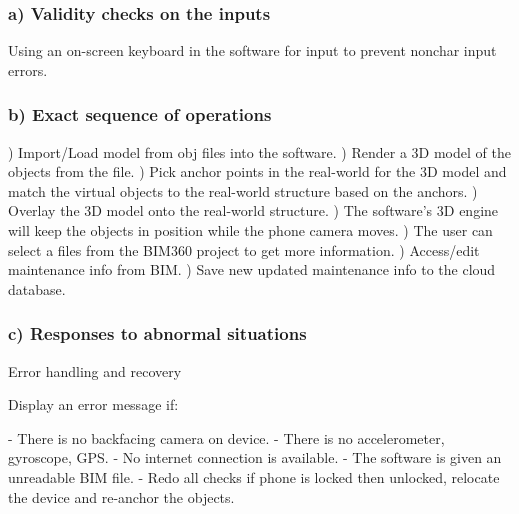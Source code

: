 \documentclass[onecolumn, draftclsnofoot,10pt, compsoc]{IEEEtran}
\begin{document}
        \subsubsection*{a) Validity checks on the inputs}
            \hangindent=10mm\noindent Using an on-screen keyboard in the software for input to prevent nonchar input errors. \par

        \subsubsection*{b) Exact sequence of operations}
            \hangindent=10mm) Import/Load model from obj files into the software. ) Render a 3D model of the objects from the file. ) Pick anchor points in the real-world for the 3D model and match the virtual objects to the real-world structure based on the anchors. ) Overlay the 3D model onto the real-world structure. ) The software's 3D engine will keep the objects in position while the phone camera moves. ) The user can select a files from the BIM360 project to get more information. ) Access/edit maintenance info from BIM. ) Save new updated maintenance info to the cloud database. \par
        \subsubsection*{c) Responses to abnormal situations}
            \hangindent=10mm\noindent
            Error handling and recovery \par
            \hangindent=15mm\noindent
            Display an error message if: \par
            \hangindent=20mm\noindent
                    - There is no backfacing camera on device. \newline
                    - There is no accelerometer, gyroscope, GPS. \newline
                    - No internet connection is available. \newline
                    - The software is given an unreadable BIM file. \newline
                    - Redo all checks if phone is locked then unlocked, relocate the device and re-anchor the objects. \newline
             \par
\end{document}
